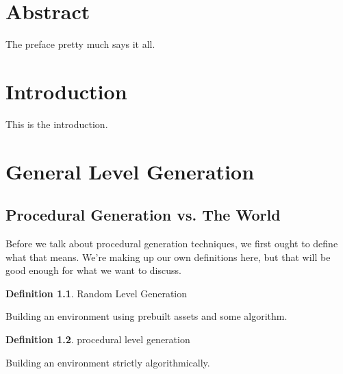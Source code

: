 \documentclass[12pt,twoside]{reedthesis}
\begin{document}
    \tableofcontents
    \listoftables
    \listoffigures

    \chapter*{Abstract}
	The preface pretty much says it all.

  \mainmatter %
  \pagestyle{fancyplain} %


    \chapter*{Introduction}

	
	This is the introduction.
	
\chapter{General Level Generation}
\section{Procedural Generation vs. The World}
Before we talk about procedural generation techniques, we first ought to define what that means. We're making up our own definitions here, but that will be good enough for what we want to discuss.
\theoremstyle{definition}
\newtheorem{definition}{Definition}[section]
\begin{definition}{Random Level Generation}

Building an environment using prebuilt assets and some algorithm.
\end{definition}
\begin{definition}{procedural level generation}

Building an environment strictly algorithmically.
\end{definition}
 
\end{document}
